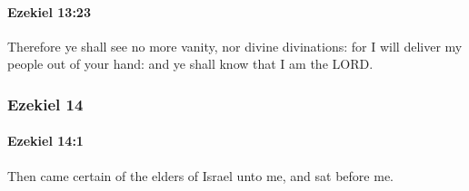 		\paragraph{Ezekiel 13:23} %
			\label{EZEKIEL-13-23}

			Therefore ye shall see no more vanity, nor divine divinations: for I will deliver my people out of your hand: and ye shall know that I am the LORD.

	\subsubsection{Ezekiel 14} %
		\label{EZEKIEL-14}

		\paragraph{Ezekiel 14:1} %
			\label{EZEKIEL-14-1}

			Then came certain of the elders of Israel unto me, and sat before me.

